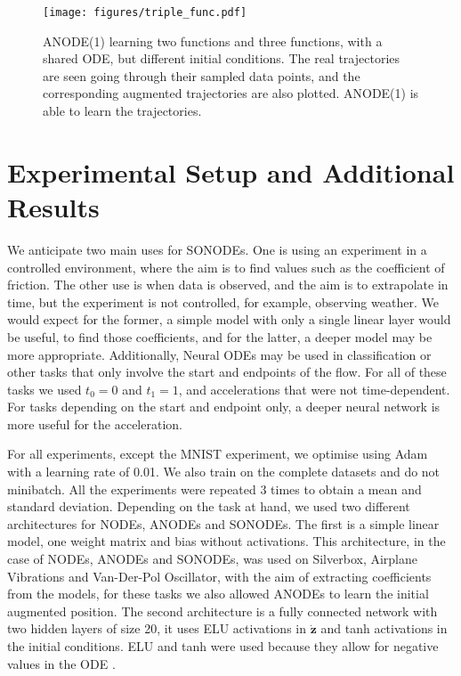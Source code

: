 \documentclass{article}
\theoremstyle{remark}
\theoremstyle{definition}
\begin{document}
\begin{figure}[h]
    \centering
    \texttt{[image: figures/triple\_func.pdf]}
    \caption{ANODE(1) learning two functions and three functions, with a shared ODE, but different initial conditions. The real trajectories are seen going through their sampled data points, and the corresponding augmented trajectories are also plotted. ANODE(1) is able to learn the trajectories.}
    \label{fig: anode_3_funcs}
\end{figure}







\section{Experimental Setup and Additional Results}
\label{app: experimental_setup}

We anticipate two main uses for SONODEs. One is using an experiment in a controlled environment, where the aim is to find values such as the coefficient of friction. The other use is when data is observed, and the aim is to extrapolate in time, but the experiment is not controlled, for example, observing weather. We would expect for the former, a simple model with only a single linear layer would be useful, to find those coefficients, and for the latter, a deeper model may be more appropriate. Additionally, Neural ODEs may be used in classification or other tasks that only involve the start and endpoints of the flow. For all of these tasks we used $t_{0}=0$ and $t_{1}=1$, and accelerations that were not time-dependent. For tasks depending on the start and endpoint only, a deeper neural network is more useful for the acceleration.

For all experiments, except the MNIST experiment, we optimise using Adam with a learning rate of 0.01. We also train on the complete datasets and do not minibatch. All the experiments were repeated 3 times to obtain a mean and standard deviation. Depending on the task at hand, we used two different architectures for NODEs, ANODEs and SONODEs. The first is a simple linear model, one weight matrix and bias without activations. This architecture, in the case of NODEs, ANODEs and SONODEs, was used on Silverbox, Airplane Vibrations and Van-Der-Pol Oscillator, with the aim of extracting coefficients from the models, for these tasks we also allowed ANODEs to learn the initial augmented position. The second architecture is a fully connected network with two hidden layers of size 20, it uses ELU activations in $\dot{\mathbf{z}}$ and tanh activations in the initial conditions. ELU and tanh were used because they allow for negative values in the ODE \cite{massaroli2020dissecting}.  
\end{document}
